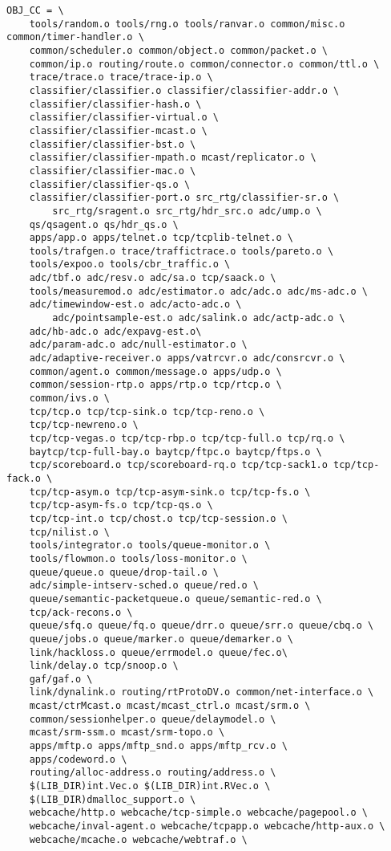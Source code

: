 \begin{verbatim}
OBJ_CC = \
	tools/random.o tools/rng.o tools/ranvar.o common/misc.o common/timer-handler.o \
	common/scheduler.o common/object.o common/packet.o \
	common/ip.o routing/route.o common/connector.o common/ttl.o \
	trace/trace.o trace/trace-ip.o \
	classifier/classifier.o classifier/classifier-addr.o \
	classifier/classifier-hash.o \
	classifier/classifier-virtual.o \
	classifier/classifier-mcast.o \
	classifier/classifier-bst.o \
	classifier/classifier-mpath.o mcast/replicator.o \
	classifier/classifier-mac.o \
	classifier/classifier-qs.o \
	classifier/classifier-port.o src_rtg/classifier-sr.o \
        src_rtg/sragent.o src_rtg/hdr_src.o adc/ump.o \
	qs/qsagent.o qs/hdr_qs.o \
	apps/app.o apps/telnet.o tcp/tcplib-telnet.o \
	tools/trafgen.o trace/traffictrace.o tools/pareto.o \
	tools/expoo.o tools/cbr_traffic.o \
	adc/tbf.o adc/resv.o adc/sa.o tcp/saack.o \
	tools/measuremod.o adc/estimator.o adc/adc.o adc/ms-adc.o \
	adc/timewindow-est.o adc/acto-adc.o \
        adc/pointsample-est.o adc/salink.o adc/actp-adc.o \
	adc/hb-adc.o adc/expavg-est.o\
	adc/param-adc.o adc/null-estimator.o \
	adc/adaptive-receiver.o apps/vatrcvr.o adc/consrcvr.o \
	common/agent.o common/message.o apps/udp.o \
	common/session-rtp.o apps/rtp.o tcp/rtcp.o \
	common/ivs.o \
	tcp/tcp.o tcp/tcp-sink.o tcp/tcp-reno.o \
	tcp/tcp-newreno.o \
	tcp/tcp-vegas.o tcp/tcp-rbp.o tcp/tcp-full.o tcp/rq.o \
	baytcp/tcp-full-bay.o baytcp/ftpc.o baytcp/ftps.o \
	tcp/scoreboard.o tcp/scoreboard-rq.o tcp/tcp-sack1.o tcp/tcp-fack.o \
	tcp/tcp-asym.o tcp/tcp-asym-sink.o tcp/tcp-fs.o \
	tcp/tcp-asym-fs.o tcp/tcp-qs.o \
	tcp/tcp-int.o tcp/chost.o tcp/tcp-session.o \
	tcp/nilist.o \
	tools/integrator.o tools/queue-monitor.o \
	tools/flowmon.o tools/loss-monitor.o \
	queue/queue.o queue/drop-tail.o \
	adc/simple-intserv-sched.o queue/red.o \
	queue/semantic-packetqueue.o queue/semantic-red.o \
	tcp/ack-recons.o \
	queue/sfq.o queue/fq.o queue/drr.o queue/srr.o queue/cbq.o \
	queue/jobs.o queue/marker.o queue/demarker.o \
	link/hackloss.o queue/errmodel.o queue/fec.o\
	link/delay.o tcp/snoop.o \
	gaf/gaf.o \
	link/dynalink.o routing/rtProtoDV.o common/net-interface.o \
	mcast/ctrMcast.o mcast/mcast_ctrl.o mcast/srm.o \
	common/sessionhelper.o queue/delaymodel.o \
	mcast/srm-ssm.o mcast/srm-topo.o \
	apps/mftp.o apps/mftp_snd.o apps/mftp_rcv.o \
	apps/codeword.o \
	routing/alloc-address.o routing/address.o \
	$(LIB_DIR)int.Vec.o $(LIB_DIR)int.RVec.o \
	$(LIB_DIR)dmalloc_support.o \
	webcache/http.o webcache/tcp-simple.o webcache/pagepool.o \
	webcache/inval-agent.o webcache/tcpapp.o webcache/http-aux.o \
	webcache/mcache.o webcache/webtraf.o \

\end{verbatim}
